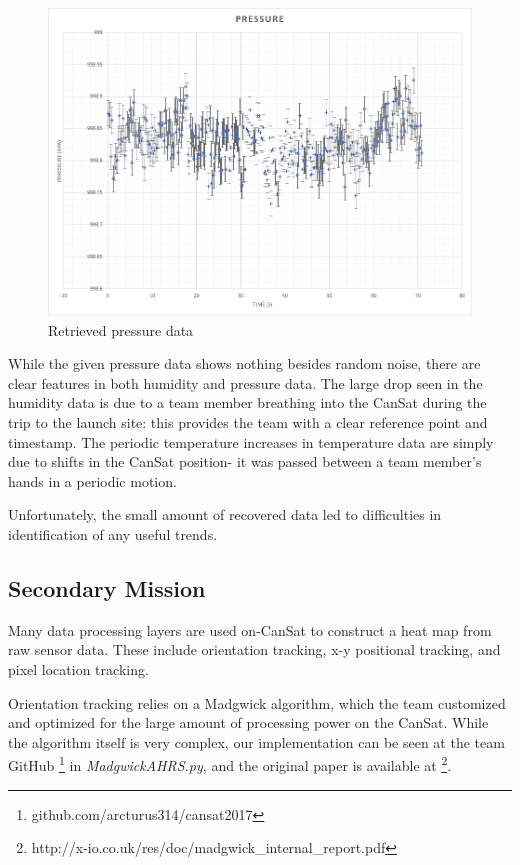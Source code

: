 \documentclass[]{report}
\begin{document}
	\begin{figure}[h]
		\hfill\includegraphics[scale=0.7]{pres_fin.png}\hspace*{\fill}
		\caption{Retrieved pressure data}
		\label{rp}
	\end{figure}

	While the given pressure data shows nothing besides random noise, there are clear features in both humidity and pressure data. The large drop seen in the humidity data is due to a team member breathing into the CanSat during the trip to the launch site: this provides the team with a clear reference point and timestamp. The periodic temperature increases in temperature data are simply due to shifts in the CanSat position- it was passed between a team member's hands in a periodic motion.
	
	Unfortunately, the small amount of recovered data led to difficulties in identification of any useful trends.
	
	\subsection{Secondary Mission}
	
	Many data processing layers are used on-CanSat to construct a heat map from raw sensor data. These include orientation tracking, x-y positional tracking, and pixel location tracking.
	
	Orientation tracking relies on a Madgwick algorithm, which the team customized and optimized for the large amount of processing power on the CanSat. While the algorithm itself is very complex, our implementation can be seen at the team GitHub \footnote{github.com/arcturus314/cansat2017} in \textit{MadgwickAHRS.py}, and the original paper is available at \footnote{http://x-io.co.uk/res/doc/madgwick\_internal\_report.pdf}.
	
\end{document}
